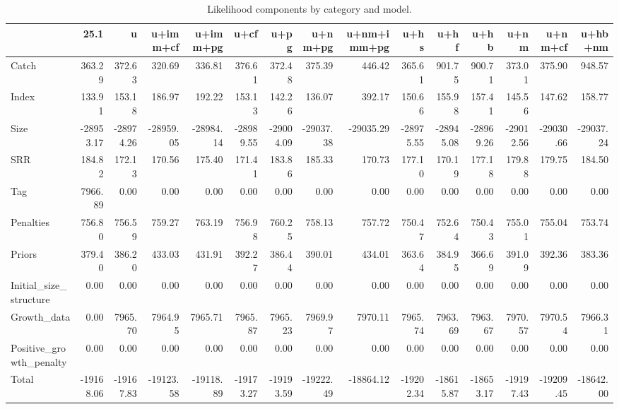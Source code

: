 \documentclass[
]{article}
\begin{document}
\newpage
\begin{landscape}

\begin{table}

\caption{\label{tab:like-comp-tot}\label{tab:like-comp-tot} Likelihood components by category and model.}
\centering
\begin{tabular}[t]{l|r|r|r|r|r|r|r|r|r|r|r|r|r|r}
\hline
  & 25.1 & u & u+imm+cf & u+imm+pg & u+cf & u+pg & u+nm+pg & u+nm+imm+pg & u+hs & u+hf & u+hb & u+nm & u+nm+cf & u+hb+nm\\
\hline
Catch & 363.29 & 372.63 & 320.69 & 336.81 & 376.61 & 372.48 & 375.39 & 446.42 & 365.61 & 901.75 & 900.71 & 373.01 & 375.90 & 948.57\\
\hline
Index & 133.91 & 153.18 & 186.97 & 192.22 & 153.13 & 142.26 & 136.07 & 392.17 & 150.66 & 155.98 & 157.41 & 145.56 & 147.62 & 158.77\\
\hline
Size & -28953.17 & -28974.26 & -28959.05 & -28984.14 & -28989.55 & -29004.09 & -29037.38 & -29035.29 & -28975.55 & -28945.08 & -28969.26 & -29012.56 & -29030.66 & -29037.24\\
\hline
SRR & 184.82 & 172.13 & 170.56 & 175.40 & 171.41 & 183.86 & 185.33 & 170.73 & 177.10 & 170.19 & 177.18 & 179.88 & 179.75 & 184.50\\
\hline
Tag & 7966.89 & 0.00 & 0.00 & 0.00 & 0.00 & 0.00 & 0.00 & 0.00 & 0.00 & 0.00 & 0.00 & 0.00 & 0.00 & 0.00\\
\hline
Penalties & 756.80 & 756.59 & 759.27 & 763.19 & 756.98 & 760.25 & 758.13 & 757.72 & 750.47 & 752.64 & 750.43 & 755.01 & 755.04 & 753.74\\
\hline
Priors & 379.40 & 386.20 & 433.03 & 431.91 & 392.27 & 386.44 & 390.01 & 434.01 & 363.64 & 384.95 & 366.69 & 391.09 & 392.36 & 383.36\\
\hline
Initial\_size\_structure & 0.00 & 0.00 & 0.00 & 0.00 & 0.00 & 0.00 & 0.00 & 0.00 & 0.00 & 0.00 & 0.00 & 0.00 & 0.00 & 0.00\\
\hline
Growth\_data & 0.00 & 7965.70 & 7964.95 & 7965.71 & 7965.87 & 7965.23 & 7969.97 & 7970.11 & 7965.74 & 7963.69 & 7963.67 & 7970.57 & 7970.54 & 7966.31\\
\hline
Positive\_growth\_penalty & 0.00 & 0.00 & 0.00 & 0.00 & 0.00 & 0.00 & 0.00 & 0.00 & 0.00 & 0.00 & 0.00 & 0.00 & 0.00 & 0.00\\
\hline
Total & -19168.06 & -19167.83 & -19123.58 & -19118.89 & -19173.27 & -19193.59 & -19222.49 & -18864.12 & -19202.34 & -18615.87 & -18653.17 & -19197.43 & -19209.45 & -18642.00\\
\hline
\end{tabular}
\end{table}

\end{landscape}
\end{document}
